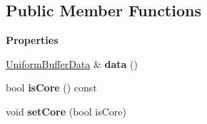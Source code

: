 \subsection*{Public Member Functions}
\begin{Indent}\textbf{ Properties}\par
\begin{DoxyCompactItemize}
\item 
\mbox{\label{classrev_1_1_u_b_o_acca978ed69c826e23ac5241e60bbf732}} 
\mbox{\hyperlink{structrev_1_1_uniform_buffer_data}{Uniform\+Buffer\+Data}} \& {\bfseries data} ()
\item 
\mbox{\label{classrev_1_1_u_b_o_a8672b8dbbb1df450b963046a54c40d6c}} 
bool {\bfseries is\+Core} () const
\item 
\mbox{\label{classrev_1_1_u_b_o_afaf932c9e40d48f4dc806b8316a32e8a}} 
void {\bfseries set\+Core} (bool is\+Core)
\end{DoxyCompactItemize}
\end{Indent}
